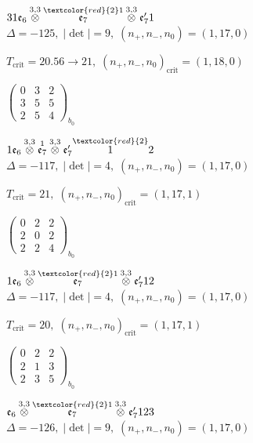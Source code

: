\documentclass[10pt]{article}
\begin{document}
$31\mathfrak{e}_6\overset{3,3}{\otimes}\overset{\textcolor{red}{2}1}{\mathfrak{e}_7}\overset{3,3}{\otimes}\mathfrak{e}_7'1$ \quad $\Delta=-125,\; |\det|=9,\; (n_+,n_-,n_0)=(1,17,0)$

\hspace{1em}$T_{\text{crit}}=20.56 \to 21,\; (n_+,n_-,n_0)_{\text{crit}}=(1,18,0)$

\hspace{2em}$\left(\begin{smallmatrix}0 & 3 & 2 \\ 3 & 5 & 5 \\ 2 & 5 & 4\end{smallmatrix}\right)_{\!b_0}$

\smallskip

$1\mathfrak{e}_6\overset{3,3}{\otimes}\overset{1}{\mathfrak{e}_7}\overset{3,3}{\otimes}\mathfrak{e}_7'\overset{\textcolor{red}{2}}{1}2$ \quad $\Delta=-117,\; |\det|=4,\; (n_+,n_-,n_0)=(1,17,0)$

\hspace{1em}$T_{\text{crit}}=21,\; (n_+,n_-,n_0)_{\text{crit}}=(1,17,1)$

\hspace{2em}$\left(\begin{smallmatrix}0 & 2 & 2 \\ 2 & 0 & 2 \\ 2 & 2 & 4\end{smallmatrix}\right)_{\!b_0}$

$1\mathfrak{e}_6\overset{3,3}{\otimes}\overset{\textcolor{red}{2}1}{\mathfrak{e}_7}\overset{3,3}{\otimes}\mathfrak{e}_7'12$ \quad $\Delta=-117,\; |\det|=4,\; (n_+,n_-,n_0)=(1,17,0)$

\hspace{1em}$T_{\text{crit}}=20,\; (n_+,n_-,n_0)_{\text{crit}}=(1,17,1)$

\hspace{2em}$\left(\begin{smallmatrix}0 & 2 & 2 \\ 2 & 1 & 3 \\ 2 & 3 & 5\end{smallmatrix}\right)_{\!b_0}$

\smallskip

$\mathfrak{e}_6\overset{3,3}{\otimes}\overset{\textcolor{red}{2}1}{\mathfrak{e}_7}\overset{3,3}{\otimes}\mathfrak{e}_7'123$ \quad $\Delta=-126,\; |\det|=9,\; (n_+,n_-,n_0)=(1,17,0)$
\end{document}
